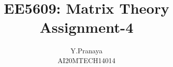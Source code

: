 \documentclass[journal,12pt,twocolumn]{IEEEtran}
\begin{document}
\makeatother
\let\StandardTheFigure\thefigure
\let\vec\mathbf
\renewcommand{\thefigure}{\theproblem}
\def\putbox#1#2#3{\makebox[0in][l]{\makebox[#1][l]{}\raisebox{\baselineskip}[0in][0in]{\raisebox{#2}[0in][0in]{#3}}}}
     \def\rightbox#1{\makebox[0in][r]{#1}}
     \def\centbox#1{\makebox[0in]{#1}}
     \def\topbox#1{\raisebox{-\baselineskip}[0in][0in]{#1}}
     \def\midbox#1{\raisebox{-0.5\baselineskip}[0in][0in]{#1}}
\vspace{3cm}
\title{EE5609: Matrix Theory\\
          Assignment-4\\}
\author{Y.Pranaya\\
AI20MTECH14014 }
%
%
%
% 
%
\end{document}
